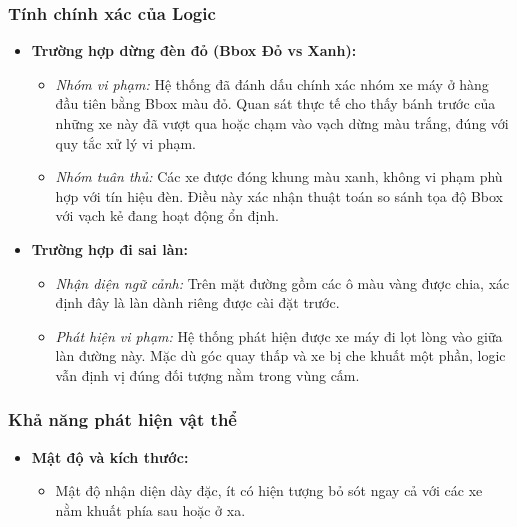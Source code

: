 \subsubsection{Tính chính xác của Logic}
\begin{itemize}
    \item \textbf{Trường hợp dừng đèn đỏ (Bbox Đỏ vs Xanh):}
    \begin{itemize}
        \item \textit{Nhóm vi phạm:} Hệ thống đã đánh dấu chính xác nhóm xe máy ở hàng đầu tiên bằng Bbox màu đỏ. Quan sát thực tế cho thấy bánh trước của những xe này đã vượt qua hoặc chạm vào vạch dừng màu trắng, đúng với quy tắc xử lý vi phạm.
        \item \textit{Nhóm tuân thủ:} Các xe được đóng khung màu xanh, không vi phạm phù hợp với tín hiệu đèn. Điều này xác nhận thuật toán so sánh tọa độ Bbox với vạch kẻ đang hoạt động ổn định.
    \end{itemize}

    \item \textbf{Trường hợp đi sai làn:}
    \begin{itemize}
        \item \textit{Nhận diện ngữ cảnh:} Trên mặt đường gồm các ô màu vàng được chia, xác định đây là làn dành riêng được cài đặt trước.
        \item \textit{Phát hiện vi phạm:} Hệ thống phát hiện được xe máy đi lọt lòng vào giữa làn đường này. Mặc dù góc quay thấp và xe bị che khuất một phần, logic vẫn định vị đúng đối tượng nằm trong vùng cấm.
    \end{itemize}
\end{itemize}

\subsubsection{Khả năng phát hiện vật thể}
\begin{itemize}
    \item \textbf{Mật độ và kích thước:}
    \begin{itemize}
        \item Mật độ nhận diện dày đặc, ít có hiện tượng bỏ sót ngay cả với các xe nằm khuất phía sau hoặc ở xa.
    \end{itemize}
\end{itemize}

